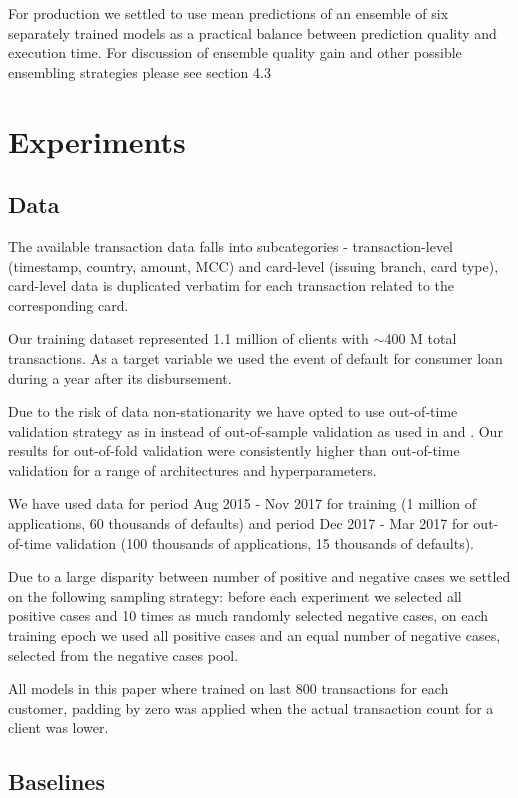 \documentclass{sigkddExp}
\begin{document}
For production we settled to use mean predictions of an ensemble of six separately trained models as a practical balance between prediction quality and execution time. For discussion of ensemble quality gain and other possible ensembling strategies please see section 4.3

\section{Experiments}
\subsection{Data}

The available transaction data falls into subcategories - transaction-level (timestamp, country, amount, MCC) and card-level (issuing branch, card type), card-level data is duplicated verbatim for each transaction related to the corresponding card.

Our training dataset represented 1.1 million of clients with $\sim400$ M total transactions. As a target variable we used the event of default for consumer loan during a year after its disbursement.

Due to the risk of data non-stationarity we have opted to use out-of-time validation strategy as in \cite{KVAMME2018207} instead of out-of-sample validation as used in \cite{khandani2010consumer} and \cite{bellotti2013forecasting}. Our results for out-of-fold validation were consistently higher than out-of-time validation for a range of architectures and hyperparameters.

We have used data for period Aug 2015 - Nov 2017 for training  (1 million of applications, 60 thousands of defaults) and period Dec 2017 - Mar 2017 for out-of-time validation (100 thousands of applications, 15 thousands of defaults).

Due to a large disparity between number of positive and negative cases we settled on the following sampling strategy: before each experiment we selected all positive cases and 10 times as much randomly selected negative cases, on each training epoch we used all positive cases and an equal number of negative cases, selected from the negative cases pool.

All models in this paper where trained on last 800 transactions for each customer, padding by zero was applied when the actual transaction count for a client was lower.

\subsection{Baselines}
\end{document}
